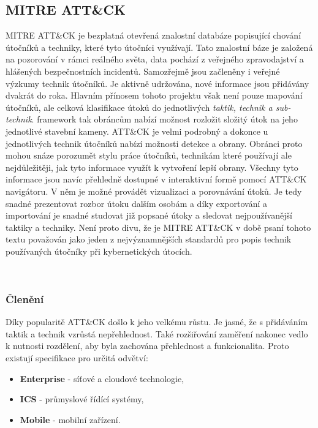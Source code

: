 \subsection{MITRE ATT\&CK}
MITRE ATT\&CK je bezplatná otevřená znalostní databáze popisující chování útočníků a techniky, které tyto útočníci využívají.
Tato znalostní báze je založená na pozorování v rámci reálného světa, data pochází z veřejného zpravodajství a hlášených bezpečnostních incidentů.
Samozřejmě jsou začleněny i veřejné výzkumy technik útočníků.
Je aktivně udržována, nové informace jsou přidávány dvakrát do roka\cite{mitre_attack_framework_faq}.
Hlavním přínosem tohoto projektu však není pouze mapování útočníků, ale celková klasifikace útoků do jednotlivých \textit{taktik, technik a sub-technik}.
framework tak obráncům nabízí možnost rozložit složitý útok na jeho jednotlivé stavební kameny.
ATT\&CK je velmi podrobný a dokonce u jednotlivých technik útočníků nabízí možnosti detekce a obrany.
Obránci proto mohou snáze porozumět stylu práce útočníků, technikám které používají ale nejdůležitěji, jak tyto informace využít k vytvoření lepší obrany.
Všechny tyto informace jsou navíc přehledně dostupné v interaktivní formě pomocí ATT\&CK navigátoru\cite{mitre_attack_navigator}.
V něm je možné provádět vizualizaci a porovnávání útoků.
Je tedy snadné prezentovat rozbor útoku dalším osobám a díky exportování a importování je snadné studovat již popsané útoky a sledovat nejpoužívanější taktiky a techniky.
Není proto divu, že je MITRE ATT\&CK v době psaní tohoto textu považován jako jeden z nejvýznamnějších standardů pro popis technik používaných útočníky při kybernetických útocích.\cite{mitre_attack_framework}

~

\subsubsection{Členění}
Díky popularitě ATT\&CK došlo k jeho velkému růstu.
Je jasné, že s přidáváním taktik a technik vzrůstá nepřehlednost.
Také rozšiřování zaměření nakonec vedlo k nutnosti rozdělení, aby byla zachována přehlednost a funkcionalita.
Proto existují specifikace pro určitá odvětví:

\begin{itemize}
	\item \textbf{Enterprise} - síťové a cloudové technologie,
	\item \textbf{ICS} - průmyslové řídící systémy,
	\item \textbf{Mobile} - mobilní zařízení.
\end{itemize}

